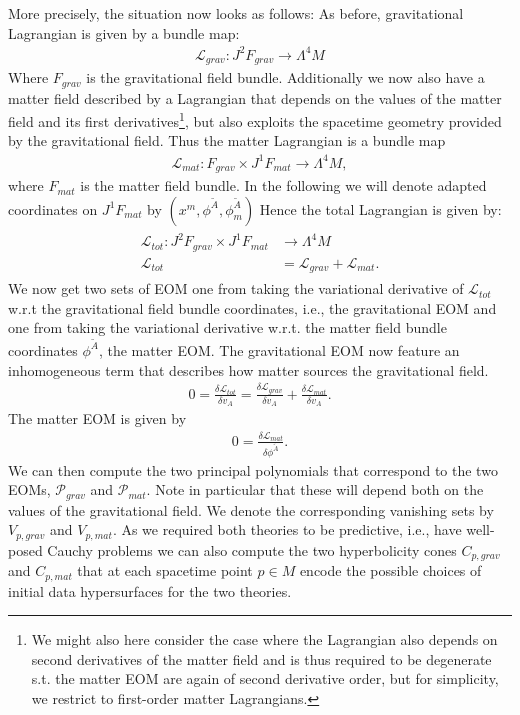 More precisely, the situation now looks as follows:
As before, gravitational Lagrangian is given by a bundle map:
\begin{align}
    \mathcal{L}_{grav} : J^2F_{grav} \longrightarrow \Lambda^4M
\end{align}
Where $F_{grav}$ is the gravitational field bundle. Additionally we now also have a matter field described by a Lagrangian that depends on the values of the matter field and its first derivatives\footnote{We might also here consider the case where the Lagrangian also depends on second derivatives of the matter field and is thus required to be degenerate s.t. the matter EOM are again of second derivative order, but for simplicity, we restrict to first-order matter Lagrangians.}, but also exploits the spacetime geometry provided by the gravitational field. Thus the matter Lagrangian is a bundle map
\begin{align}
    \mathcal{L}_{mat} : F_{grav} \times J^1F_{mat} \longrightarrow \Lambda^4M,
\end{align}
where $F_{mat}$ is the matter field bundle. In the following we will denote adapted coordinates on $J^1F_{mat}$ by $(x^m,\phi^{\tilde{A}},\phi^{\tilde{A}}_m)$ Hence the total Lagrangian is given by:
\begin{align}
\begin{aligned}
    \mathcal{L}_{tot} : J^2F_{grav} \times J^1F_{mat} &\longrightarrow \Lambda^4M \\
    \mathcal{L}_{tot} &= \mathcal{L}_{grav} + \mathcal{L}_{mat}.
\end{aligned}
\end{align}
We now get two sets of EOM one from taking the variational derivative of $\mathcal{L}_{tot}$ w.r.t the gravitational field bundle coordinates, i.e., the gravitational EOM and one from taking the variational derivative w.r.t. the matter field bundle coordinates $\phi^{\tilde{A}}$, the matter EOM.
The gravitational EOM now feature an inhomogeneous term that describes how matter sources the gravitational field.
\begin{align}
    0 = \frac{\delta \mathcal{L}_{tot}}{\delta v_A} = \frac{\delta \mathcal{L}_{grav}}{\delta v_A} + \frac{\delta \mathcal{L}_{mat}}{\delta v_A}.
\end{align}
The matter EOM is given by 
\begin{align}
    0 = \frac{\delta \mathcal{L}_{mat}}{\delta \phi^{\tilde{A}}}.
\end{align}
We can then compute the two principal polynomials that correspond to the two EOMs, $\mathcal{P}_{grav}$ and $\mathcal{P}_{mat}$. Note in particular that these will depend both on the values of the gravitational field. We denote the corresponding vanishing sets by $V_{p,grav}$ and $V_{p,mat}$. As we required both theories to be predictive, i.e., have well-posed Cauchy problems we can also compute the two hyperbolicity cones $C_{p,grav}$ and $C_{p,mat}$ that at each spacetime point $p\in M$ encode the possible choices of initial data hypersurfaces for the two theories. 

